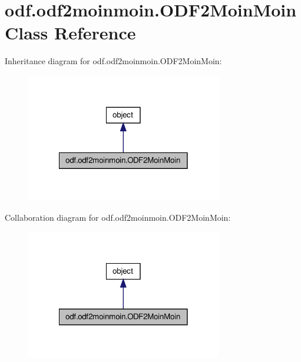 \hypertarget{classodf_1_1odf2moinmoin_1_1ODF2MoinMoin}{\section{odf.\+odf2moinmoin.\+O\+D\+F2\+Moin\+Moin Class Reference}
\label{classodf_1_1odf2moinmoin_1_1ODF2MoinMoin}
}


Inheritance diagram for odf.\+odf2moinmoin.\+O\+D\+F2\+Moin\+Moin\+:
\nopagebreak
\begin{figure}[H]
\begin{center}
\leavevmode
\includegraphics[width=242pt]{classodf_1_1odf2moinmoin_1_1ODF2MoinMoin__inherit__graph}
\end{center}
\end{figure}


Collaboration diagram for odf.\+odf2moinmoin.\+O\+D\+F2\+Moin\+Moin\+:
\nopagebreak
\begin{figure}[H]
\begin{center}
\leavevmode
\includegraphics[width=242pt]{classodf_1_1odf2moinmoin_1_1ODF2MoinMoin__coll__graph}
\end{center}
\end{figure}
